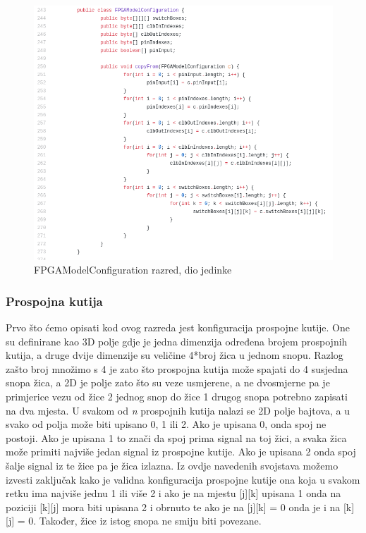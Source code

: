 \documentclass[times, utf8, zavrsni]{fer}
\begin{document}
	\begin{figure}[!htb]
		\centering
		\includegraphics[width=18cm]{slike/FPGAModelConf.png}
		\caption{FPGAModelConfiguration razred, dio jedinke}
		\label{fig:fpga-model-conf}
	\end{figure} 
	
	\subsubsection{Prospojna kutija}
	
	Prvo što ćemo opisati kod ovog razreda jest konfiguracija prospojne kutije. One su definirane kao 3D polje gdje je jedna dimenzija određena brojem prospojnih kutija, a druge dvije dimenzije su veličine 4*broj žica u jednom snopu. Razlog zašto broj množimo s 4 je zato što prospojna kutija može spajati do 4 susjedna snopa žica, a 2D je polje zato što su veze usmjerene, a ne dvosmjerne pa je primjerice vezu od žice 2 jednog snop do žice 1 drugog snopa potrebno zapisati na dva mjesta. U svakom od \emph{n} prospojnih kutija nalazi se 2D polje bajtova, a u svako od polja može biti upisano 0, 1 ili 2. Ako je upisana 0, onda spoj ne postoji. Ako je upisana 1 to znači da spoj prima signal na toj žici, a svaka žica može primiti najviše jedan signal iz prospojne kutije. Ako je upisana 2 onda spoj šalje signal iz te žice pa je žica izlazna. Iz ovdje navedenih svojstava možemo izvesti zaključak kako je validna konfiguracija prospojne kutije ona koja u svakom retku ima najviše jednu 1 ili više 2 i ako je na mjestu [j][k] upisana 1 onda na poziciji [k][j] mora biti upisana 2 i obrnuto te ako je na [j][k] = 0 onda je i na [k][j] = 0. Također, žice iz istog snopa ne smiju biti povezane.
	
\end{document}
